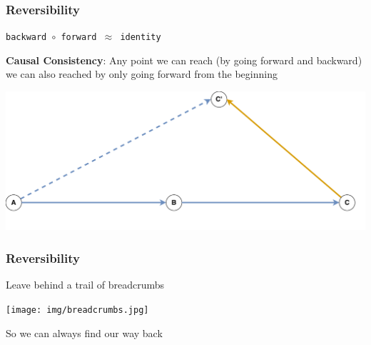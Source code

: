 \documentclass[12pt]{beamer}
\begin{document}
\begin{frame}
\frametitle{Reversibility}

\begin{center}
    \Large{\texttt{backward $\circ$ forward $\approx$ identity}}
\end{center}

\textbf{Causal Consistency}: Any point we can reach (by going forward and backward) we can also reached by 
only going forward from the beginning

% 

\begin{center}
\includegraphics[scale=0.40]{causal-consistency.pdf}
\end{center}

\end{frame}




\begin{frame}
\frametitle{Reversibility}


\begin{center}
    \Large{Leave behind a trail of breadcrumbs} 
    \begin{center}
        \texttt{[image: img/breadcrumbs.jpg]}
    \end{center}
So we can always find our way back
\end{center}
\end{frame}
\end{document}
